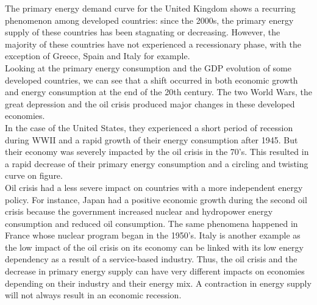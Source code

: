 \documentclass[conference]{IEEEtran}
\begin{document}
The primary energy demand curve for the United Kingdom shows a recurring phenomenon among developed countries: since the 2000s, the primary energy supply of these countries has been stagnating or decreasing. However, the majority of these countries have not experienced a recessionary phase, with the exception of Greece, Spain and Italy for example.
\\
Looking at the primary energy consumption and the GDP evolution of some developed countries, we can see that a shift occurred in both economic growth and energy consumption at the end of the 20th century. The two World Wars, the great depression and the oil crisis produced major changes in these developed economies. 
\\
In the case of the United States, they experienced a short period of recession during WWII and a rapid growth of their energy consumption after 1945. But their economy was severely impacted by the oil crisis in the 70’s. This resulted in a rapid decrease of their primary energy consumption and a circling and twisting curve on figure. 
\\
Oil crisis had a less severe impact on countries with a more independent energy policy. For instance, Japan had a positive economic growth during the second oil crisis because the government increased nuclear and hydropower energy consumption and reduced oil consumption. The same phenomena happened in France whose nuclear program began in the 1950’s. 
Italy is another example as the low impact of the oil crisis on its economy can be linked with its low energy dependency as a result of a service-based industry. 
Thus, the oil crisis and the decrease in primary energy supply can have very different impacts on economies depending on their industry and their energy mix. A contraction in energy supply will not always result in an economic recession. 
\\
\end{document}
